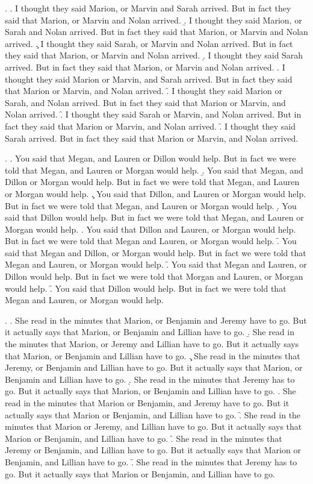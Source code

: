 \documentclass[preprint,review,12pt,authoryear,times]{elsarticle}
\begin{document}
\ex. 
\a. I thought they said Marion, or Marvin and Sarah arrived. But in fact they said that Marion, or Marvin and Nolan arrived.
\b. I thought they said Marion, or Sarah and Nolan arrived. But in fact they said that Marion, or Marvin and Nolan arrived.
\c. I thought they said Sarah, or Marvin and Nolan arrived. But in fact they said that Marion, or Marvin and Nolan arrived.
\d. I thought they said Sarah arrived. But in fact they said that Marion, or Marvin and Nolan arrived.
\e. I thought they said Marion or Marvin, and Sarah arrived. But in fact they said that Marion or Marvin, and Nolan arrived.
\f. I thought they said Marion or Sarah, and Nolan arrived. But in fact they said that Marion or Marvin, and Nolan arrived.
\f. I thought they said Sarah or Marvin, and Nolan arrived. But in fact they said that Marion or Marvin, and Nolan arrived.
\f. I thought they said Sarah arrived. But in fact they said that Marion or Marvin, and Nolan arrived.

\ex. 
\a. You said that Megan, and Lauren or Dillon would help. But in fact we were told that Megan, and Lauren or Morgan would help.
\b. You said that Megan, and Dillon or Morgan would help. But in fact we were told that Megan, and Lauren or Morgan would help.
\c. You said that Dillon, and Lauren or Morgan would help. But in fact we were told that Megan, and Lauren or Morgan would help.
\d. You said that Dillon would help. But in fact we were told that Megan, and Lauren or Morgan would help.
\e. You said that Dillon and Lauren, or Morgan would help. But in fact we were told that Megan and Lauren, or Morgan would help.
\f. You said that Megan and Dillon, or Morgan would help. But in fact we were told that Megan and Lauren, or Morgan would help.
\f. You said that Megan and Lauren, or Dillon would help. But in fact we were told that Morgan and Lauren, or Morgan would help.
\f. You said that Dillon would help. But in fact we were told that Megan and Lauren, or Morgan would help.

\ex. 
\a. She read in the minutes that Marion, or Benjamin and Jeremy have to go. But it actually says that Marion, or Benjamin and Lillian have to go.
\b. She read in the minutes that Marion, or Jeremy and Lillian have to go. But it actually says that Marion, or Benjamin and Lillian have to go.
\c. She read in the minutes that Jeremy, or Benjamin and Lillian have to go. But it actually says that Marion, or Benjamin and Lillian have to go.
\d. She read in the minutes that Jeremy has to go. But it actually says that Marion, or Benjamin and Lillian have to go.
\e. She read in the minutes that Marion or Benjamin, and Jeremy have to go. But it actually says that Marion or Benjamin, and Lillian have to go.
\f. She read in the minutes that Marion or Jeremy, and Lillian have to go. But it actually says that Marion or Benjamin, and Lillian have to go.
\f. She read in the minutes that Jeremy or Benjamin, and Lillian have to go. But it actually says that Marion or Benjamin, and Lillian have to go.
\f. She read in the minutes that Jeremy has to go. But it actually says that Marion or Benjamin, and Lillian have to go.
\end{document}
